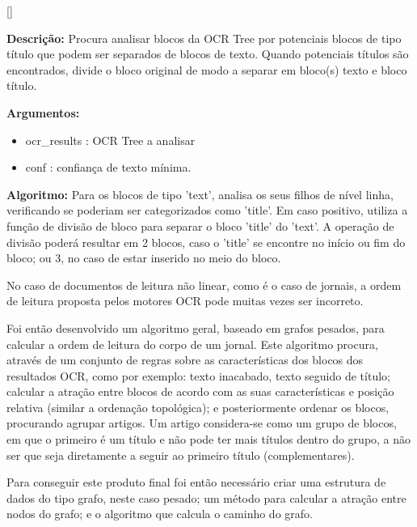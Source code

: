[\normalsize]

\textbf{Descrição:} Procura analisar blocos da OCR Tree por potenciais blocos de tipo título que podem ser separados de blocos de texto. Quando potenciais títulos são encontrados, divide o bloco original de modo a separar em bloco(s) texto e bloco título.

\textbf{Argumentos:}
\begin{itemize}\setlength\itemsep{-0.3em}
	\item ocr\_results : OCR Tree a analisar
	\item conf : confiança de texto mínima.
\end{itemize}

\textbf{Algoritmo:} Para os blocos de tipo 'text', analisa os seus filhos de nível linha, verificando se poderiam ser categorizados como 'title'. Em caso positivo, utiliza a função de divisão de bloco para separar o bloco 'title' do 'text'. A operação de divisão poderá resultar em 2 blocos, caso o 'title' se encontre no início ou fim do bloco; ou 3, no caso de estar inserido no meio do bloco.




\label{contribution_reading_order}

No caso de documentos de leitura não linear, como é o caso de jornais, a ordem de leitura proposta pelos motores OCR pode muitas vezes ser incorreto.


Foi então desenvolvido um algoritmo geral, baseado em grafos pesados, para calcular a ordem de leitura do corpo de um jornal. Este algoritmo procura, através de um conjunto de regras sobre as características dos blocos dos resultados OCR, como por exemplo: texto inacabado, texto seguido de título; calcular a atração entre blocos de acordo com as suas características e posição relativa (similar a ordenação topológica); e posteriormente ordenar os blocos, procurando agrupar artigos. Um artigo considera-se como um grupo de blocos, em que o primeiro é um título e não pode ter mais títulos dentro do grupo, a não ser que seja diretamente a seguir ao primeiro título (complementares).

Para conseguir este produto final foi então necessário criar uma estrutura de dados do tipo grafo, neste caso pesado; um método para calcular a atração entre nodos do grafo; e o algoritmo que calcula o caminho do grafo.

